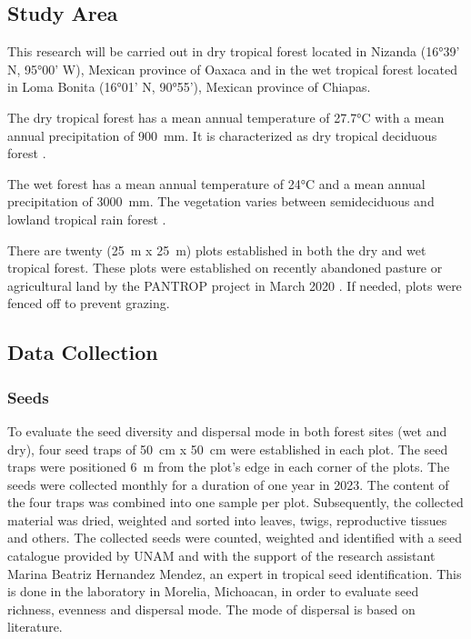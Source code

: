 

\subsection{Study Area}
This research will be carried out in dry tropical forest located in Nizanda (16°39' N, 95°00' W), Mexican province of Oaxaca and in the wet tropical forest located in Loma Bonita (16°01' N, 90°55'), Mexican province of Chiapas. 

The dry tropical forest has a mean annual temperature of 27.7°C with a mean annual precipitation of 900~mm. It is characterized as dry tropical deciduous forest \citep{hordijkLandUseHistory2024}. 

The wet forest has a mean annual temperature of 24°C and a mean annual precipitation of 3000~mm. The vegetation varies between semideciduous and lowland tropical rain forest \citep{hordijkLandUseHistory2024}.

There are twenty (25~m x 25~m) plots established in both the dry and wet tropical forest. These plots were established on recently abandoned pasture or agricultural land by the PANTROP project in March 2020 \citep{hordijkLandUseHistory2024}. If needed, plots were fenced off to prevent grazing. 


\subsection{Data Collection}

\subsubsection{Seeds}
To evaluate the seed diversity and dispersal mode in both forest sites (wet and dry), four seed traps of 50~cm x 50~cm were established in each plot. The seed traps were positioned 6~m from the plot's edge in each corner of the plots. The seeds were collected monthly for a duration of one year in 2023. The content of the four traps was combined into one sample per plot.
Subsequently, the collected material was dried, weighted and sorted into leaves, twigs, reproductive tissues and others. The collected seeds were counted, weighted and identified with a seed catalogue provided by UNAM and with the support of the research assistant Marina Beatriz Hernandez Mendez, an expert in tropical seed identification. This is done in the laboratory in Morelia, Michoacan, in order to evaluate seed richness, evenness and dispersal mode. The mode of dispersal is based on literature.

